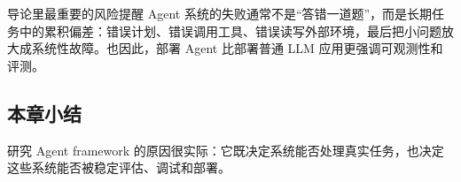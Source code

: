 \begin{warningbox}{导论里最重要的风险提醒}
Agent 系统的失败通常不是``答错一道题''，而是长期任务中的累积偏差：错误计划、错误调用工具、错误读写外部环境，最后把小问题放大成系统性故障。也因此，部署 Agent 比部署普通 LLM 应用更强调可观测性和评测。
\end{warningbox}

\subsection{本章小结}

研究 Agent framework 的原因很实际：它既决定系统能否处理真实任务，也决定这些系统能否被稳定评估、调试和部署。

